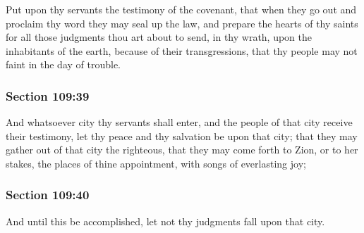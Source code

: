 		Put upon thy servants the testimony of the covenant, that when they go out and proclaim thy word they may seal up the law, and prepare the hearts of thy saints for all those judgments thou art about to send, in thy wrath, upon the inhabitants of the earth, because of their transgressions, that thy people may not faint in the day of trouble.


	\subsubsection{Section 109:39} %
		\label{DC109-39}

		And whatsoever city thy servants shall enter, and the people of that city receive their testimony, let thy peace and thy salvation be upon that city; that they may gather out of that city the righteous, that they may come forth to Zion, or to her stakes, the places of thine appointment, with songs of everlasting joy;


	\subsubsection{Section 109:40} %
		\label{DC109-40}

		And until this be accomplished, let not thy judgments fall upon that city.


